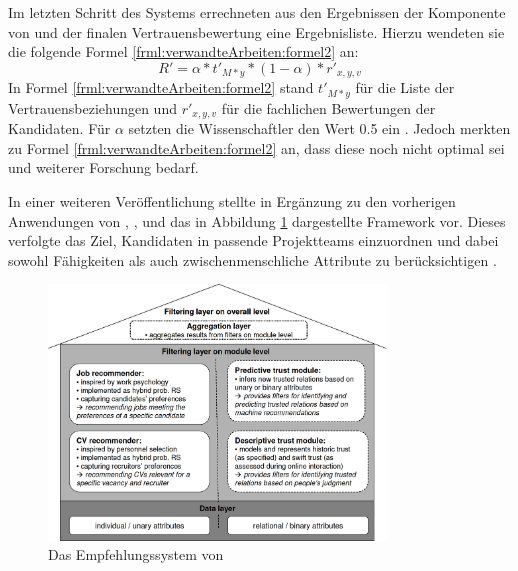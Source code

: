 Im letzten Schritt des Systems errechneten \textcite[S. 9f.]{malinowski:2005} aus den Ergebnissen der Komponente von \textcite[S. 8ff.]{faerber:2003} und der finalen Vertrauensbewertung eine Ergebnisliste. Hierzu wendeten sie die folgende Formel \ref{frml:verwandteArbeiten:formel2} an:
\begin{equation}
	R' = \alpha * t'_{M*y} * (1-\alpha) * r'_{x,y,v}
	\label{frml:verwandteArbeiten:formel2}
\end{equation}
In Formel \ref{frml:verwandteArbeiten:formel2} stand $t'_{M*y}$ für die Liste der Vertrauensbeziehungen und $r'_{x,y,v}$ für die fachlichen Bewertungen der Kandidaten. Für $\alpha$ setzten die Wissenschaftler den Wert 0.5 ein \cite[S. 4ff.]{malinowski:2005}. Jedoch merkten \textcite[S. 9]{malinowski:2005} zu Formel \ref{frml:verwandteArbeiten:formel2} an, dass diese noch nicht optimal sei und weiterer Forschung bedarf.

In einer weiteren Veröffentlichung stellte \textcite[S. 1ff.]{keim:2007} in Ergänzung zu den vorherigen Anwendungen von \textcite[S. 6ff.]{faerber:2003}, \textcite[S. 4ff.]{keim:2005}, \textcite[S. 4ff.]{malinowski:2005} und \textcite[S. 3ff.]{malinowski:2006} das in Abbildung \ref{fig:verwandteArbeiten:abb3} dargestellte Framework vor. Dieses verfolgte das Ziel, Kandidaten in passende Projektteams einzuordnen und dabei sowohl Fähigkeiten als auch zwischenmenschliche Attribute zu berücksichtigen \cite[S. 1ff.]{keim:2007}.

\begin{figure}[h]
	\centering
	\includegraphics[width=0.8\textwidth]{gfx/keim-multilayer.png}
	\caption{Das Empfehlungssystem von \textcite[S. 5]{keim:2007}}
	\label{fig:verwandteArbeiten:abb3}
\end{figure}

